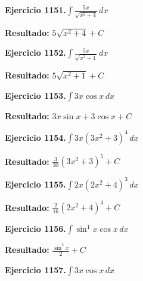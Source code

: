 \documentclass[10pt,a4paper]{article}
\begin{document}
\begin{ejbox}
\textbf{Ejercicio 1151.}\quad $\int \frac{5x}{\sqrt{x^2+4}}\,dx$
\end{ejbox}

\begin{solbox}
\textbf{Resultado:} \(\displaystyle 5\sqrt{x^2+4} + C\)
\end{solbox}

\begin{ejbox}
\textbf{Ejercicio 1152.}\quad $\int \frac{5x}{\sqrt{x^2+1}}\,dx$
\end{ejbox}

\begin{solbox}
\textbf{Resultado:} \(\displaystyle 5\sqrt{x^2+1} + C\)
\end{solbox}

\newpage
\begin{ejbox}
\textbf{Ejercicio 1153.}\quad $\int 3x \cos x\,dx$
\end{ejbox}

\begin{solbox}
\textbf{Resultado:} \(\displaystyle 3x\sin x + 3\cos x + C\)
\end{solbox}

\begin{ejbox}
\textbf{Ejercicio 1154.}\quad $\int 3x(3x^2 + 3)^{4}\,dx$
\end{ejbox}

\begin{solbox}
\textbf{Resultado:} \(\displaystyle \frac{3}{30}(3x^2+3)^{5} + C\)
\end{solbox}

\begin{ejbox}
\textbf{Ejercicio 1155.}\quad $\int 2x(2x^2 + 4)^{3}\,dx$
\end{ejbox}

\begin{solbox}
\textbf{Resultado:} \(\displaystyle \frac{2}{16}(2x^2+4)^{4} + C\)
\end{solbox}

\newpage
\begin{ejbox}
\textbf{Ejercicio 1156.}\quad $\int \sin^{1}x \cos x\,dx$
\end{ejbox}

\begin{solbox}
\textbf{Resultado:} \(\displaystyle \frac{\sin^{2}x}{2} + C\)
\end{solbox}

\begin{ejbox}
\textbf{Ejercicio 1157.}\quad $\int 3x \cos x\,dx$
\end{ejbox}
\end{document}
